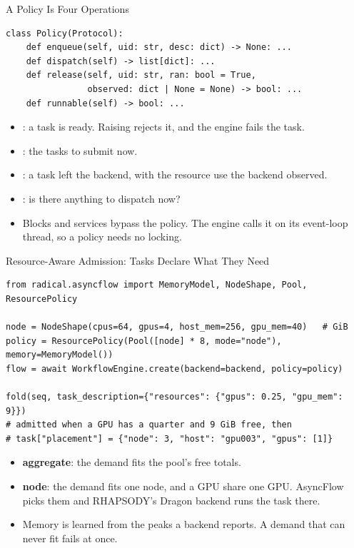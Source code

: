 \documentclass[aspectratio=169, 10pt, t]{beamer}
\begin{document}
\begin{frame}[fragile]{A Policy Is Four Operations}
\begin{lstlisting}
class Policy(Protocol):
    def enqueue(self, uid: str, desc: dict) -> None: ...
    def dispatch(self) -> list[dict]: ...
    def release(self, uid: str, ran: bool = True,
                observed: dict | None = None) -> bool: ...
    def runnable(self) -> bool: ...
\end{lstlisting}
\bodysmall
\begin{itemize}
  \item {}: a task is ready. Raising rejects it, and the engine fails the task.
  \item {}: the tasks to submit now.
  \item {}: a task left the backend, with the resource use the backend observed.
  \item {}: is there anything to dispatch now?
  \item Blocks and services bypass the policy. The engine calls it on its event-loop thread, so a policy needs no locking.
\end{itemize}
\end{frame}

\begin{frame}[fragile]{Resource-Aware Admission: Tasks Declare What They Need}
\begin{lstlisting}
from radical.asyncflow import MemoryModel, NodeShape, Pool, ResourcePolicy

node = NodeShape(cpus=64, gpus=4, host_mem=256, gpu_mem=40)   # GiB
policy = ResourcePolicy(Pool([node] * 8, mode="node"), memory=MemoryModel())
flow = await WorkflowEngine.create(backend=backend, policy=policy)

fold(seq, task_description={"resources": {"gpus": 0.25, "gpu_mem": 9}})
# admitted when a GPU has a quarter and 9 GiB free, then
# task["placement"] = {"node": 3, "host": "gpu003", "gpus": [1]}
\end{lstlisting}
\bodysmall
\begin{itemize}
  \item \textbf{aggregate}: the demand fits the pool's free totals.
  \item \textbf{node}: the demand fits one node, and a GPU share one GPU. AsyncFlow picks them and RHAPSODY's Dragon backend runs the task there.
  \item Memory is learned from the peaks a backend reports. A demand that can never fit fails at once.
\end{itemize}
\end{frame}
\end{document}
